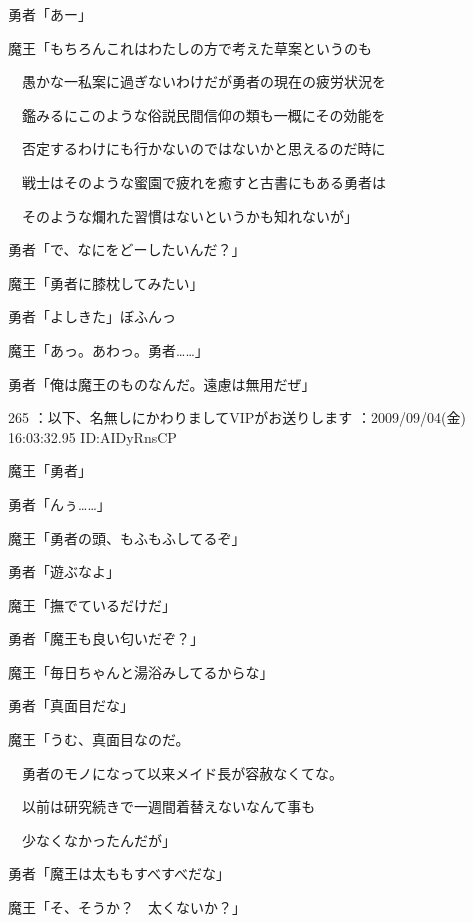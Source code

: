 \documentclass[a4j,twocolumn]{tarticle}
\begin{document}
勇者「あー」 



魔王「もちろんこれはわたしの方で考えた草案というのも\par{} 
　愚かな一私案に過ぎないわけだが勇者の現在の疲労状況を\par{} 
　鑑みるにこのような俗説民間信仰の類も一概にその効能を\par{} 
　否定するわけにも行かないのではないかと思えるのだ時に\par{} 
　戦士はそのような蜜園で疲れを癒すと古書にもある勇者は\par{} 
　そのような爛れた習慣はないというかも知れないが」 



勇者「で、なにをどーしたいんだ？」\par{} 
魔王「勇者に膝枕してみたい」 



勇者「よしきた」ぼふんっ 



魔王「あっ。あわっ。勇者……」\par{} 
勇者「俺は魔王のものなんだ。遠慮は無用だぜ」 

	
    
    

265 ：以下、名無しにかわりましてVIPがお送りします ：2009/09/04(金) 16:03:32.95 ID:AIDyRnsCP 


魔王「勇者」\par{} 
勇者「んぅ……」 



魔王「勇者の頭、もふもふしてるぞ」\par{} 
勇者「遊ぶなよ」\par{} 
魔王「撫でているだけだ」 



勇者「魔王も良い匂いだぞ？」\par{} 
魔王「毎日ちゃんと湯浴みしてるからな」 



勇者「真面目だな」\par{} 
魔王「うむ、真面目なのだ。\par{} 
　勇者のモノになって以来メイド長が容赦なくてな。\par{} 
　以前は研究続きで一週間着替えないなんて事も\par{} 
　少なくなかったんだが」 



勇者「魔王は太ももすべすべだな」\par{} 
魔王「そ、そうか？　太くないか？」 
\end{document}
